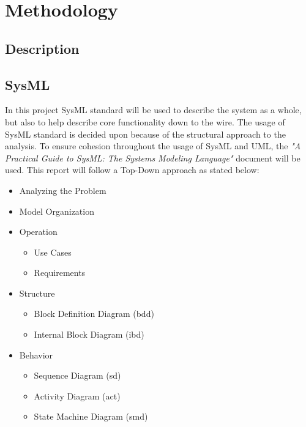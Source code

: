 \section{Methodology}
\subsection{Description}
\noindent{}


\subsection{SysML}
In this project SysML standard will be used to describe the system as a whole, but also to help describe core functionality down to the wire. The usage of SysML standard is decided upon because of the structural approach to the analysis. To ensure cohesion throughout the usage of SysML and UML, the \textit{"A Practical Guide to SysML: The Systems Modeling Language"}\cite{Friedenthal2014} document will be used. This report will follow a Top-Down approach as stated below:

\begin{itemize}
	\item Analyzing the Problem
	\item Model Organization
	\item Operation
	\begin{itemize}
		\item Use Cases
		\item Requirements
	\end{itemize}
	\item Structure
	\begin{itemize}
		\item Block Definition Diagram (bdd)
		\item Internal Block Diagram (ibd)
	\end{itemize}
	\item Behavior
	\begin{itemize}
		\item Sequence Diagram (sd)
		\item Activity Diagram (act)
		\item State Machine Diagram (smd)
	\end{itemize}
\end{itemize}


